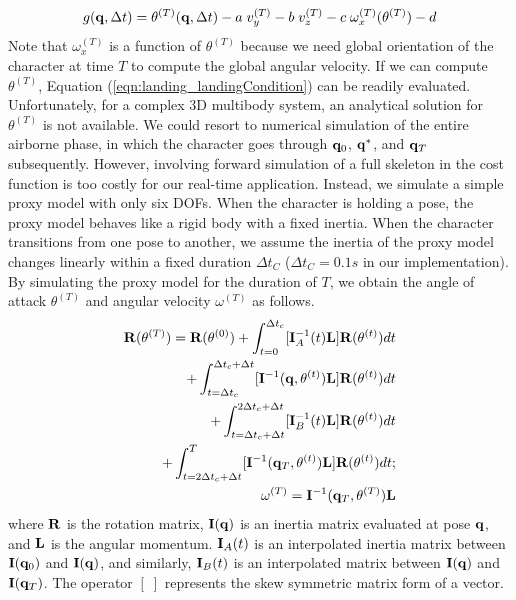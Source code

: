 \begin{equation}
g(\mathbf{q}, \Delta t) = \theta^{(T)}(\mathbf{q}, \Delta t) - a \;v_y^{(T)} - b \;v_z^{(T)} - c\;
\omega_x^{(T)}(\theta^{(T)}) - d
\label{eqn:landing_landingCondition}
\end{equation}
Note that $\omega_x^{(T)}$ is a function of $\theta^{(T)}$ because we
need global orientation of the character at time $T$ to compute the
global angular velocity. If we can compute $\theta^{(T)}$, Equation
(\ref{eqn:landing_landingCondition}) can be readily evaluated. Unfortunately,
for a complex 3D multibody system, an analytical solution for
$\theta^{(T)}$ is not available. We could resort to numerical
simulation of the entire airborne phase, in which the character goes
through $\mathbf{q}_0$, $\mathbf{q}^*$, and $\mathbf{q}_T$ subsequently. However,
involving forward simulation of a full skeleton in the cost function
is too costly for our real-time application. Instead, we simulate a simple proxy model
with only six DOFs. When the character is holding a pose, the proxy
model behaves like a rigid body with a fixed inertia.  When the
character transitions from one pose to another, we assume the inertia
of the proxy model changes linearly within a fixed duration $\Delta
t_C$ ($\Delta t_C = 0.1s$ in our implementation). By simulating the proxy
model for the duration of $T$, we obtain the angle of attack
$\theta^{(T)}$ and angular velocity $\omega^{(T)}$ as
follows.
\begin{eqnarray}
\mathbf{R}(\theta^{(T)}) = \mathbf{R}(\theta^{(0)}) + \int_{t=0}^{\Delta t_c}
[\mathbf{I}^{-1}_{A}(t)\mathbf{L}]\mathbf{R}(\theta^{(t)}) dt \nonumber \\ 
+ \int_{t=\Delta t_c}^{\Delta t_c + \Delta
  t}[\mathbf{I}^{-1}(\mathbf{q},\theta^{(t)})\mathbf{L}]\mathbf{R}(\theta^{(t)}) dt \nonumber \\ + \int_{t=\Delta
  t_c+\Delta t}^{2 \Delta t_c + \Delta t}
[\mathbf{I}^{-1}_{B}(t)\mathbf{L}]\mathbf{R}(\theta^{(t)}) dt \nonumber \\ +
\int_{t=2 \Delta t_c+\Delta t}^T
[\mathbf{I}^{-1}(\mathbf{q}_T,\theta^{(t)})\mathbf{L}]\mathbf{R}(\theta^{(t)}) dt; \\
\omega^{(T)} = \mathbf{I}^{-1}(\mathbf{q}_T,\theta^{(T)})\mathbf{L}
\end{eqnarray}
where $\mathbf{R}$ is the rotation matrix, $\mathbf{I}(\mathbf{q})$ is an inertia
matrix evaluated at pose $\mathbf{q}$, and $\mathbf{L}$ is the angular
momentum. $\mathbf{I}_{A}(t)$ is an interpolated inertia matrix between $\mathbf{I}(\mathbf{q}_0)$ and
$\mathbf{I}(\mathbf{q})$, and similarly, $\mathbf{I}_{B}(t)$ is an interpolated matrix between
$\mathbf{I}(\mathbf{q})$ and $\mathbf{I}(\mathbf{q}_T)$. The operator $[\;]$ represents the skew
symmetric matrix form of a vector.

